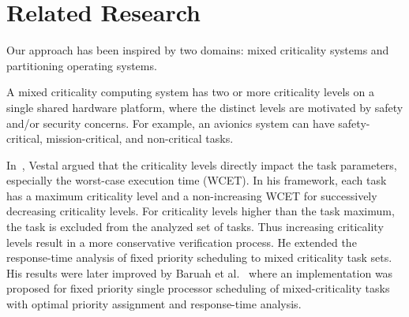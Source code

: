 \section{Related Research}
\label{sec:related}

Our approach has been inspired by two domains: mixed criticality systems
and partitioning operating systems. 
\iffalse
Mixed criticality systems provide
support to multiple functionalities that can be of different
criticality, or importance to the system. 
\fi
A mixed criticality
computing system has two or more criticality levels on a single
shared hardware platform, where the distinct levels are motivated by
safety and/or security concerns. For example, an avionics system can
have safety-critical, mission-critical, and non-critical tasks.

\iffalse
In his seminal paper on mixed criticality scheduling,
Vestal~\cite{Vestal2007} 
\fi
In~\cite{Vestal2007}, Vestal argued that the criticality levels directly
impact the task parameters, especially the worst-case execution time
(WCET). In his framework, each task has a maximum criticality level
and a non-increasing WCET for successively decreasing criticality
levels. For criticality levels higher than the task maximum, the
task is excluded from the analyzed set of tasks. Thus increasing
criticality levels result in a more conservative verification
process.  He extended the response-time analysis
of fixed priority scheduling to mixed criticality task sets.
His  results were later improved by Baruah et
al.~\cite{BaruahRTA4MCS} where an implementation was proposed for
fixed priority single processor scheduling of mixed-criticality tasks
with optimal priority assignment and response-time analysis.
%
%
% 

